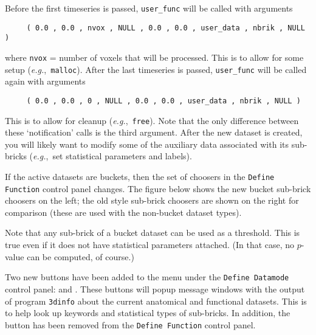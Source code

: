 Before the first timeseries is passed, {\tt user\_func} will be called with arguments
\begin{verbatim}
     ( 0.0 , 0.0 , nvox , NULL , 0.0 , 0.0 , user_data , nbrik , NULL )
\end{verbatim}
where {\tt nvox} = number of voxels that will be processed.
This is to allow for some setup ({\it e.g.},~{\tt malloc}).
After the last timeseries is passed, {\tt user\_func} will be called again with
arguments
\begin{verbatim}
     ( 0.0 , 0.0 , 0 , NULL , 0.0 , 0.0 , user_data , nbrik , NULL )
\end{verbatim}
This is to allow for cleanup ({\it e.g.},~{\tt free}).  Note that the
only difference between these `notification' calls is the third argument.
After the new dataset is created, you will likely want to modify
some of the auxiliary data associated with its sub-bricks ({\it e.g.},~set
statistical parameters and labels).

If the active datasets are buckets, then the set of choosers
in the {\tt Define Function} control panel changes.  The
figure below shows the new bucket sub-brick choosers on the
left; the old style sub-brick choosers are shown on the right
for comparison (these are used with the non-bucket dataset types).\vspace{1ex}

\centerline{\epsfxsize=2.5in
            \blob\blob\blob
            \epsfxsize=2.5in}

\centerline{
            \blob\blob\blob
            }\vspace{1ex}

Note that any sub-brick of a bucket dataset can be used as a
threshold.  This is true even if it does not have statistical
parameters attached.  (In that case, no $p$-value can be
computed, of course.)

Two new buttons have been added to the  menu under the {\tt Define Datamode} control panel:
 and .
These buttons will popup message windows with the output of
program {\tt 3dinfo} about the current anatomical and functional datasets.
This is to help look up keywords and statistical types of sub-bricks.
In addition, the  button has been removed from the
{\tt Define Function} control panel.

